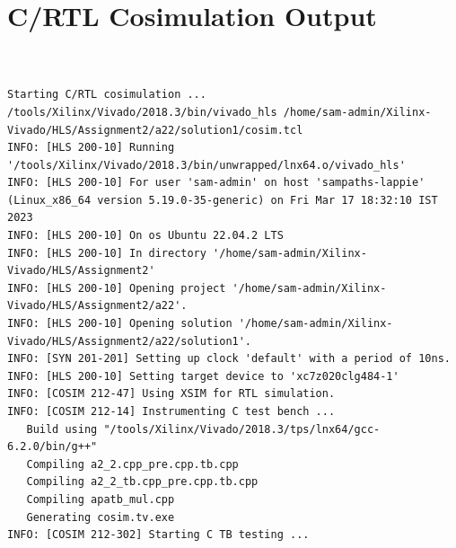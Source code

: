 \documentclass{article}
\begin{document}
\section{C/RTL Cosimulation Output}
\vspace{1cm}
\begin{lstlisting}


Starting C/RTL cosimulation ...
/tools/Xilinx/Vivado/2018.3/bin/vivado_hls /home/sam-admin/Xilinx-Vivado/HLS/Assignment2/a22/solution1/cosim.tcl
INFO: [HLS 200-10] Running '/tools/Xilinx/Vivado/2018.3/bin/unwrapped/lnx64.o/vivado_hls'
INFO: [HLS 200-10] For user 'sam-admin' on host 'sampaths-lappie' (Linux_x86_64 version 5.19.0-35-generic) on Fri Mar 17 18:32:10 IST 2023
INFO: [HLS 200-10] On os Ubuntu 22.04.2 LTS
INFO: [HLS 200-10] In directory '/home/sam-admin/Xilinx-Vivado/HLS/Assignment2'
INFO: [HLS 200-10] Opening project '/home/sam-admin/Xilinx-Vivado/HLS/Assignment2/a22'.
INFO: [HLS 200-10] Opening solution '/home/sam-admin/Xilinx-Vivado/HLS/Assignment2/a22/solution1'.
INFO: [SYN 201-201] Setting up clock 'default' with a period of 10ns.
INFO: [HLS 200-10] Setting target device to 'xc7z020clg484-1'
INFO: [COSIM 212-47] Using XSIM for RTL simulation.
INFO: [COSIM 212-14] Instrumenting C test bench ...
   Build using "/tools/Xilinx/Vivado/2018.3/tps/lnx64/gcc-6.2.0/bin/g++"
   Compiling a2_2.cpp_pre.cpp.tb.cpp
   Compiling a2_2_tb.cpp_pre.cpp.tb.cpp
   Compiling apatb_mul.cpp
   Generating cosim.tv.exe
INFO: [COSIM 212-302] Starting C TB testing ... 



\end{lstlisting}
\end{document}
